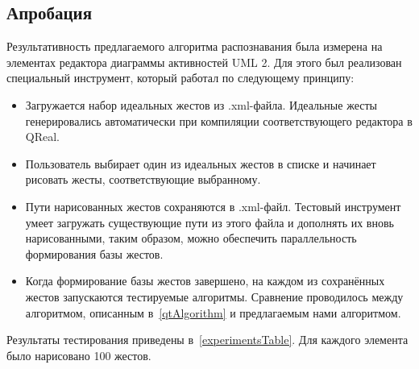 \documentclass[a5paper]{article}
\begin{document}
\subsection{Апробация}

Результативность предлагаемого алгоритма распознавания была измерена на элементах редактора диаграммы активностей UML 2. Для этого был реализован специальный инструмент, который работал по следующему принципу:
\begin{itemize}
  \item Загружается набор идеальных жестов из .xml-файла. Идеальные жесты генерировались автоматически при компиляции соответствующего редактора в QReal.
  \item Пользователь выбирает один из идеальных жестов в списке и начинает рисовать жесты, соответствующие выбранному.
  \item Пути нарисованных жестов сохраняются в .xml-файл. Тестовый инструмент умеет загружать существующие пути из этого файла и дополнять их вновь нарисованными, таким образом, можно обеспечить параллельность формирования базы жестов.
  \item Когда формирование базы жестов завершено, на каждом из сохранённых жестов запускаются тестируемые алгоритмы. Сравнение проводилось между алгоритмом, описанным в~\ref{qtAlgorithm} и предлагаемым нами алгоритмом.
\end{itemize}

Результаты тестирования приведены в~\ref{experimentsTable}. Для каждого элемента было нарисовано 100 жестов.
\end{document}
